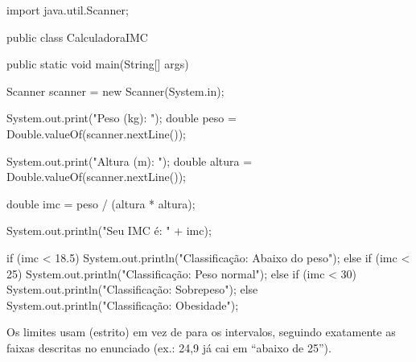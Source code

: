 \documentclass[11pt,a4paper]{article}
\begin{document}
\begin{javacode}
import java.util.Scanner;

public class CalculadoraIMC {
    public static void main(String[] args) {
        Scanner scanner = new Scanner(System.in);

        System.out.print("Peso (kg): ");
        double peso = Double.valueOf(scanner.nextLine());

        System.out.print("Altura (m): ");
        double altura = Double.valueOf(scanner.nextLine());

        double imc = peso / (altura * altura);

        System.out.println("Seu IMC é: " + imc);

        if (imc < 18.5) {
            System.out.println("Classificação: Abaixo do peso");
        } else if (imc < 25) {
            System.out.println("Classificação: Peso normal");
        } else if (imc < 30) {
            System.out.println("Classificação: Sobrepeso");
        } else {
            System.out.println("Classificação: Obesidade");
        }
    }
}
\end{javacode}

\begin{destaque}
Os limites usam \inlinecode{<} (estrito) em vez de \inlinecode{<=} para os intervalos, seguindo exatamente as faixas descritas no enunciado (ex.: 24,9 já cai em ``abaixo de 25'').
\end{destaque}
\end{document}
